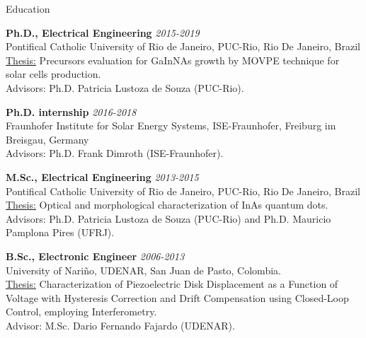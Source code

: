 \documentclass{resume} %
\begin{document}
    \begin{rSection}{Education}

        {\bf Ph.D., Electrical Engineering} \hfill {\em 2015-2019} \\ 
        {\normalfont Pontifical Catholic University of Rio de Janeiro, PUC-Rio, Rio De Janeiro, Brazil}\\
        \underline{Thesis:} {\normalfont Precursors evaluation for GaInNAs growth by MOVPE technique for solar cells production.}\\ 
        Advisors: Ph.D. Patricia Lustoza de Souza (PUC-Rio).
        
        {\bf Ph.D. internship} \hfill {\em 2016-2018} \\ 
        {\normalfont Fraunhofer Institute for Solar Energy Systems, ISE-Fraunhofer, Freiburg im Breisgau, Germany}\\
        Advisors: Ph.D. Frank Dimroth (ISE-Fraunhofer).
        
        {\bf M.Sc., Electrical Engineering} \hfill {\em 2013-2015} \\ 
        {\normalfont Pontifical Catholic University of Rio de Janeiro, PUC-Rio, Rio De Janeiro, Brazil}\\
        \underline{Thesis:} {\normalfont Optical and morphological characterization of InAs quantum dots.}\\
        Advisors: Ph.D. Patricia Lustoza de Souza (PUC-Rio) and Ph.D. Mauricio Pamplona Pires (UFRJ).
                
        {\bf B.Sc., Electronic Engineer} \hfill {\em 2006-2013} \\ 
        {\normalfont University of Nariño, UDENAR, San Juan de Pasto, Colombia.}\\
        \underline{Thesis:} {\normalfont Characterization of Piezoelectric Disk Displacement as a Function of Voltage with Hysteresis Correction and Drift Compensation using Closed-Loop Control, employing Interferometry.} \\
        Advisor: M.Sc. Dario Fernando Fajardo (UDENAR).
    \end{rSection}
    
    \newpage
    
\end{document}

